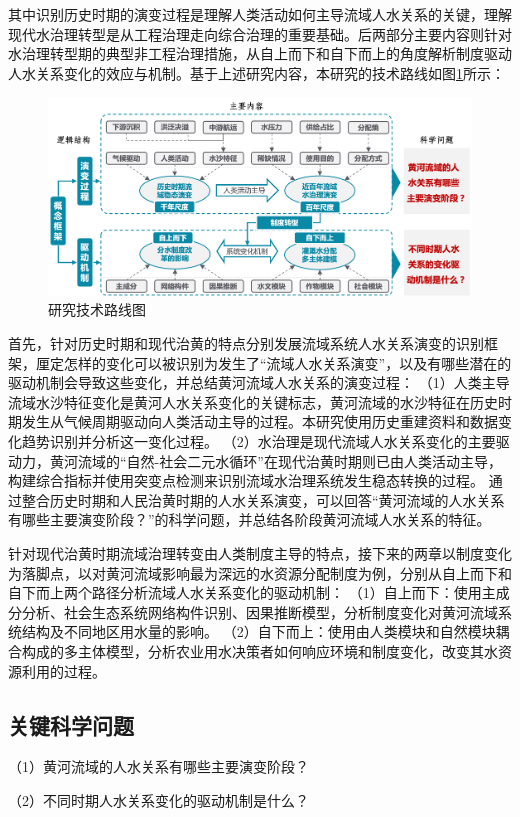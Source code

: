 其中识别历史时期的演变过程是理解人类活动如何主导流域人\textendash{}水关系的关键，理解现代水治理转型是从工程治理走向综合治理的重要基础。后两部分主要内容则针对水治理转型期的典型非工程治理措施，从自上而下和自下而上的角度解析制度驱动人\textendash{}水关系变化的效应与机制。基于上述研究内容，本研究的技术路线如图\ref{ch1:fig:workflow}所示：

\begin{figure}[!ht] %
    \includegraphics[width=\textwidth]{img/ch1/ch1_workflow.png}
    \caption{研究技术路线图}\label{ch1:fig:workflow}
\end{figure}

首先，针对历史时期和现代治黄的特点分别发展流域系统人\textendash{}水关系演变的识别框架，厘定怎样的变化可以被识别为发生了“流域人\textendash{}水关系演变”，以及有哪些潜在的驱动机制会导致这些变化，并总结黄河流域人\textendash{}水关系的演变过程：
（1）人类主导流域水沙特征变化是黄河人\textendash{}水关系变化的关键标志，黄河流域的水沙特征在历史时期发生从气候周期驱动向人类活动主导的过程。本研究使用历史重建资料和数据变化趋势识别并分析这一变化过程。
（2）水治理是现代流域人\textendash{}水关系变化的主要驱动力，黄河流域的“自然-社会二元水循环”在现代治黄时期则已由人类活动主导，构建综合指标并使用突变点检测来识别流域水治理系统发生稳态转换的过程。
通过整合历史时期和人民治黄时期的人\textendash{}水关系演变，可以回答“黄河流域的人\textendash{}水关系有哪些主要演变阶段？”的科学问题，并总结各阶段黄河流域人\textendash{}水关系的特征。

针对现代治黄时期流域治理转变由人类制度主导的特点，接下来的两章以制度变化为落脚点，以对黄河流域影响最为深远的水资源分配制度为例，分别从自上而下和自下而上两个路径分析流域人\textendash{}水关系变化的驱动机制：
（1）自上而下：使用主成分分析、社会\textendash{}生态系统网络构件识别、因果推断模型，分析制度变化对黄河流域系统结构及不同地区用水量的影响。
（2）自下而上：使用由人类模块和自然模块耦合构成的多主体模型，分析农业用水决策者如何响应环境和制度变化，改变其水资源利用的过程。

\subsection{关键科学问题}

（1）黄河流域的人\textendash{}水关系有哪些主要演变阶段？

（2）不同时期人\textendash{}水关系变化的驱动机制是什么？
